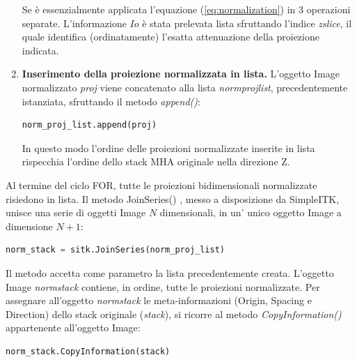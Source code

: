 \documentclass[a4paper,12pt, doubleside]{report}
\begin{document}
\begin{enumerate}
                    Se è essenzialmente applicata l'equazione (\ref{eq:normalization}) in 3 operazioni separate. L'informazione $Io$ è stata prelevata lista sfruttando l'indice \textit{zslice}, il quale identifica (ordinatamente) l'esatta attenuazione della proiezione indicata.
                    
                    \item \textbf{Inserimento della proiezione normalizzata in lista.} L'oggetto Image normalizzato \textit{proj} viene concatenato alla lista \textit{norm\textunderscore proj\textunderscore list}, precedentemente istanziata, sfruttando il metodo \textit{append()}:
                    
                    \begin{lstlisting}[language=python, frame=bt]
norm_proj_list.append(proj)
                    \end{lstlisting}
                    
                    In questo modo l'ordine delle proiezioni normalizzate inserite in lista rispecchia l'ordine dello stack MHA originale nella direzione Z.
                \end{enumerate}
                
                Al termine del ciclo FOR, tutte le proiezioni bidimensionali normalizzate risiedono in lista. Il metodo JoinSeries() \cite{sitk-joinseries}, messo a disposizione da SimpleITK, unisce una serie di oggetti Image $N$ dimensionali, in un' unico oggetto Image a dimensione $N+1$:
                
                \begin{lstlisting}[language=python, frame=bt]
norm_stack = sitk.JoinSeries(norm_proj_list)
                \end{lstlisting}
                    
                Il metodo accetta come parametro la lista precedentemente creata. L'oggetto Image \textit{norm\textunderscore stack} contiene, in ordine, tutte le proiezioni normalizzate. Per assegnare all'oggetto \textit{norm\textunderscore stack} le meta-informazioni (Origin, Spacing e Direction) dello stack originale (\textit{stack}), si ricorre al metodo \textit{CopyInformation()} \cite{sitk-copy-information} appartenente all'oggetto Image:
                
                \begin{lstlisting}[language=python, frame=bt]
norm_stack.CopyInformation(stack)
                \end{lstlisting}
                
\end{document}
